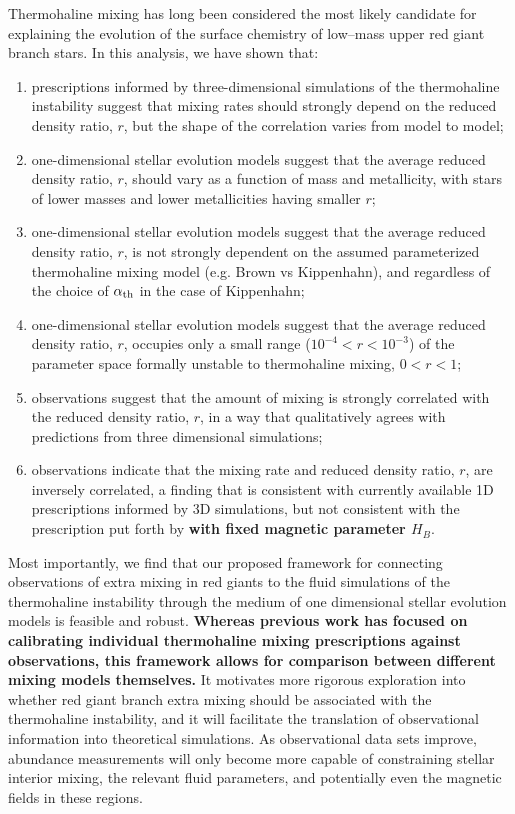 %
%
%
Thermohaline mixing has long been considered the most likely candidate for explaining the evolution of the surface chemistry of low--mass upper red giant branch stars. In this analysis, we have shown that:
%
% 
\begin{enumerate}
    \item prescriptions informed by three-dimensional simulations of the thermohaline instability suggest that mixing rates should strongly depend on the reduced density ratio, $r$, but the shape of the correlation varies from model to model; 
    
    \item one-dimensional stellar evolution models suggest that the average reduced density ratio, $r$, should vary as a function of mass and metallicity, with stars of lower masses and lower metallicities having smaller $r$;
    
    \item one-dimensional stellar evolution models suggest that the average reduced density ratio, $r$, is not strongly dependent on the assumed parameterized thermohaline mixing model (e.g. Brown vs Kippenhahn), and regardless of the choice of $\alpha_{\rm th}$ in the case of Kippenhahn; 
    
    \item one-dimensional stellar evolution models suggest that the average reduced density ratio, $r$, occupies only a small range ($10^{-4}<r<10^{-3}$) of the parameter space formally unstable to thermohaline mixing, $0<r<1$;
    
    \item observations suggest that the amount of mixing is strongly correlated with the reduced density ratio, $r$, in a way that qualitatively agrees with predictions from three dimensional simulations;
    
    \item observations indicate that the mixing rate and reduced density ratio, $r$, are inversely correlated, a finding that is consistent with 
    currently available 1D prescriptions informed by 3D simulations, but not consistent with the prescription put forth by \citet{harrington} \textbf{with fixed magnetic parameter $H_B$}.
    
    \end{enumerate}

Most importantly, we find that our proposed framework for connecting observations of extra mixing in red giants to the fluid simulations of the thermohaline instability through the medium of one dimensional stellar evolution models is feasible and robust. \textbf{Whereas previous work has focused on calibrating individual thermohaline mixing prescriptions against observations, this framework allows for comparison between different mixing models themselves.} 
%
It motivates more rigorous exploration into whether red giant branch extra mixing should be associated with the thermohaline instability, and it will facilitate the translation of observational information into theoretical simulations. As observational data sets improve, abundance measurements will only become more capable of constraining stellar interior mixing, the relevant fluid parameters, and potentially even the magnetic fields in these regions.

